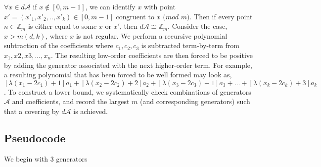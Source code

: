 \begin{centering}
\begin{block}
{$\forall x \in d \mathcal{A}$ if $x \notin [0, m-1]$, we can identify $x$ with point $x' = (x'_{1}, x'_{2}, .. , x'_{k}) \in [0, m-1]$ congruent to $x$ $(mod$ $m)$.  Then if every point $n \in \mathbb{Z}_{m}$ is either equal to some $x$ or $x'$, then $d \mathcal{A} \cong \mathbb{Z}_m$.\n
Consider the case, $x > m(d, k)$, where $x$ is not regular. We perform a recursive polynomial subtraction of the coefficients where $c_{1}, c_{2}, c_{3}$ is subtracted term-by-term from $x_{1}, x{2}, x{3}, ... , x_{n}$. The resulting low-order coefficients are then forced to be positive by adding the generator associated with the next higher-order term.\n
For example, a resulting polynomial that has been forced to be well formed may look as, $[\lambda(x_{1} - 2 c_{1}) + 1]a_{1} + [\lambda(x_{2} - 2 c_{2}) + 2]a_{2} + [\lambda(x_{3} - 2 c_{3}) + 1]a_{3} + ... + [\lambda(x_{k} - 2 c_{k}) + 3]a_{k}$.\n
To construct a lower bound, we systematically check combinations of generators $\mathcal{A}$ and coefficients, and record the largest $m$ (and corresponding generators) such that a covering by $d \mathcal{A}$ is achieved.}
\end{block}
\end{centering}


\subsection{Pseudocode}
We begin with 3 generators

